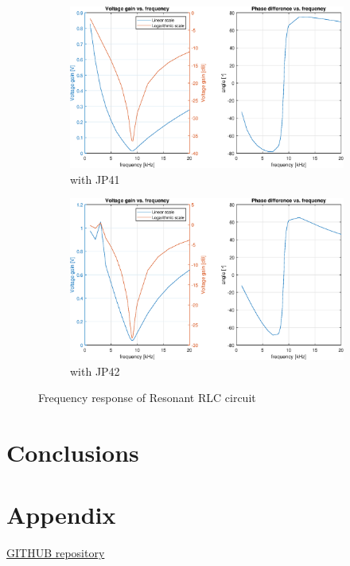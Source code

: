 \documentclass[notitlepage, a4paper, 11pt]{article}
\begin{document}
	\begin{figure}[H]
		\centering
		\begin{subfigure}{0.49\textwidth}
			\includegraphics[width=\textwidth]{../Matlab/img/131.eps}
			\caption{with JP41}
		\end{subfigure}
		\hfill
		\begin{subfigure}{0.49\textwidth}
			\includegraphics[width=\textwidth]{../Matlab/img/132.eps}
			\caption{with JP42}
		\end{subfigure}
		\caption{Frequency response of Resonant RLC circuit}
	\end{figure}
	\section{Conclusions}
	
	
	\newpage
	\appendix
	\section{Appendix}\label{sec:appendix}
	\href{https://github.com/kamilix2003/CT_labs}{GITHUB repository}
	\inputminted{matlab}{../Matlab/main.m}
	\inputminted{matlab}{../Matlab/import_csv.m}
	\inputminted{matlab}{../Matlab/characteristics.m}
\end{document}
